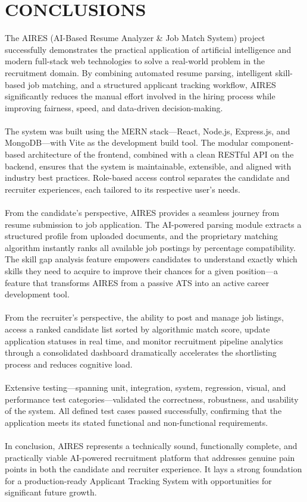 \chapter{CONCLUSIONS}

The AIRES (AI-Based Resume Analyzer \& Job Match System) project successfully demonstrates the practical application of artificial intelligence and modern full-stack web technologies to solve a real-world problem in the recruitment domain. By combining automated resume parsing, intelligent skill-based job matching, and a structured applicant tracking workflow, AIRES significantly reduces the manual effort involved in the hiring process while improving fairness, speed, and data-driven decision-making.\\\\
The system was built using the MERN stack---React, Node.js, Express.js, and MongoDB---with Vite as the development build tool. The modular component-based architecture of the frontend, combined with a clean RESTful API on the backend, ensures that the system is maintainable, extensible, and aligned with industry best practices. Role-based access control separates the candidate and recruiter experiences, each tailored to its respective user's needs.\\\\
From the candidate's perspective, AIRES provides a seamless journey from resume submission to job application. The AI-powered parsing module extracts a structured profile from uploaded documents, and the proprietary matching algorithm instantly ranks all available job postings by percentage compatibility. The skill gap analysis feature empowers candidates to understand exactly which skills they need to acquire to improve their chances for a given position---a feature that transforms AIRES from a passive ATS into an active career development tool.\\\\
From the recruiter's perspective, the ability to post and manage job listings, access a ranked candidate list sorted by algorithmic match score, update application statuses in real time, and monitor recruitment pipeline analytics through a consolidated dashboard dramatically accelerates the shortlisting process and reduces cognitive load.\\\\
Extensive testing---spanning unit, integration, system, regression, visual, and performance test categories---validated the correctness, robustness, and usability of the system. All defined test cases passed successfully, confirming that the application meets its stated functional and non-functional requirements.\\\\
In conclusion, AIRES represents a technically sound, functionally complete, and practically viable AI-powered recruitment platform that addresses genuine pain points in both the candidate and recruiter experience. It lays a strong foundation for a production-ready Applicant Tracking System with opportunities for significant future growth.


